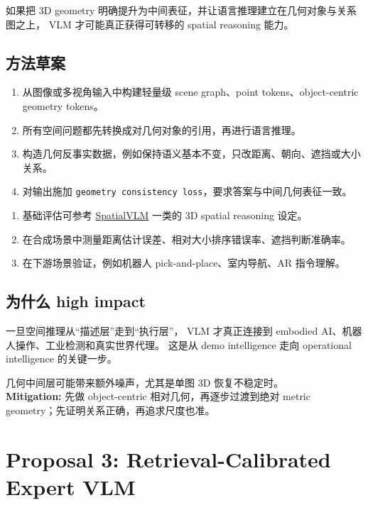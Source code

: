 \documentclass[12pt,a4paper]{article}
\begin{document}
如果把 3D geometry 明确提升为中间表征，并让语言推理建立在几何对象与关系图之上，
VLM 才可能真正获得可转移的 spatial reasoning 能力。

\subsection{方法草案}

\begin{enumerate}[leftmargin=2em]
  \item 从图像或多视角输入中构建轻量级 scene graph、point tokens、object-centric geometry tokens。
  \item 所有空间问题都先转换成对几何对象的引用，再进行语言推理。
  \item 构造几何反事实数据，例如保持语义基本不变，只改距离、朝向、遮挡或大小关系。
  \item 对输出施加 \texttt{geometry consistency loss}，要求答案与中间几何表征一致。
\end{enumerate}

\begin{expbox}
\begin{enumerate}[leftmargin=2em]
  \item 基础评估可参考 \href{https://arxiv.org/abs/2401.12168}{SpatialVLM} 一类的 3D spatial reasoning 设定。
  \item 在合成场景中测量距离估计误差、相对大小排序错误率、遮挡判断准确率。
  \item 在下游场景验证，例如机器人 pick-and-place、室内导航、AR 指令理解。
\end{enumerate}
\end{expbox}

\subsection{为什么 high impact}

一旦空间推理从``描述层''走到``执行层''，
VLM 才真正连接到 embodied AI、机器人操作、工业检测和真实世界代理。
这是从 demo intelligence 走向 operational intelligence 的关键一步。

\begin{riskbox}
几何中间层可能带来额外噪声，尤其是单图 3D 恢复不稳定时。\\
\textbf{Mitigation:}
先做 object-centric 相对几何，再逐步过渡到绝对 metric geometry；先证明关系正确，再追求尺度也准。
\end{riskbox}

\newpage
\section{Proposal 3: Retrieval-Calibrated Expert VLM}
\end{document}
